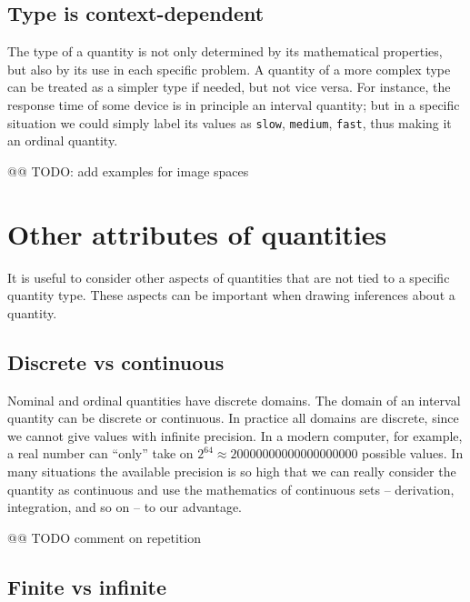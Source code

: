 \documentclass[
  a4paper,
  DIV=11,
  numbers=noendperiod,
  oneside]{scrreprt}
\begin{document}
\hypertarget{type-is-context-dependent}{%
\subsection{Type is context-dependent}\label{type-is-context-dependent}}

The type of a quantity is not only determined by its mathematical
properties, but also by its use in each specific problem. A quantity of
a more complex type can be treated as a simpler type if needed, but not
vice versa. For instance, the response time of some device is in
principle an interval quantity; but in a specific situation we could
simply label its values as \texttt{slow}, \texttt{medium},
\texttt{fast}, thus making it an ordinal quantity.

@@ TODO: add examples for image spaces

\hypertarget{other-attributes-of-quantities}{%
\section{Other attributes of
quantities}\label{other-attributes-of-quantities}}

It is useful to consider other aspects of quantities that are not tied
to a specific quantity type. These aspects can be important when drawing
inferences about a quantity.

\hypertarget{discrete-vs-continuous}{%
\subsection{Discrete vs continuous}\label{discrete-vs-continuous}}

Nominal and ordinal quantities have discrete domains. The domain of an
interval quantity can be discrete or continuous. In practice all domains
are discrete, since we cannot give values with infinite precision. In a
modern computer, for example, a real number can ``only'' take on
\(2^{64} \approx 20 000 000 000 000 000 000\) possible values. In many
situations the available precision is so high that we can really
consider the quantity as continuous and use the mathematics of
continuous sets -- derivation, integration, and so on -- to our
advantage.

@@ TODO comment on repetition

\hypertarget{finite-vs-infinite}{%
\subsection{Finite vs infinite}\label{finite-vs-infinite}}
\end{document}
